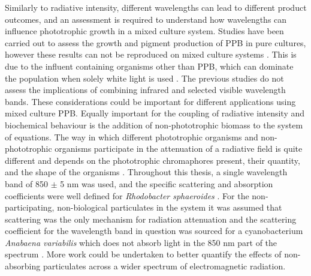 \skippingparagraph
Similarly to radiative intensity, different wavelengths can lead to different product outcomes, and an assessment is required to understand how wavelengths can influence phototrophic growth in a mixed culture system. Studies have been carried out to assess the growth and pigment production of PPB in pure cultures, however these results can not be reproduced on mixed culture systems \cite{kuo2012}. This is due to the influent containing organisms other than PPB, which can dominate the population when solely white light is used \cite{hulsen2015}. The previous studies do not assess the implications of combining infrared and selected visible wavelength bands. These considerations could be important for different applications using mixed culture PPB. 
\skippingparagraph
Equally important for the coupling of radiative intensity and biochemical behaviour is the addition of non-phototrophic biomass to the system of equations. The way in which different phototrophic organisms and non-phototrophic organisms participate in the attenuation of a radiative field is quite different and depends on the phototrophic chromaphores present, their quantity, and the shape of the organisms \cite{wagner2018}. Throughout this thesis, a single wavelength band of 850 $\pm$ 5 nm was used, and the specific scattering and absorption coefficients were well defined for \textit{Rhodobacter sphaeroides} \cite{berberoglu2007}. For the non-participating, non-biological particulates in the system it was assumed that scattering was the only mechanism for radiation attenuation and the scattering coefficient for the wavelength band in question was sourced for a cyanobacterium \textit{Anabaena variabilis} which does not absorb light in the 850 nm part of the spectrum \cite{berberoglu2007}. More work could be undertaken to better quantify the effects of non-absorbing particulates across a wider spectrum of electromagnetic radiation.


